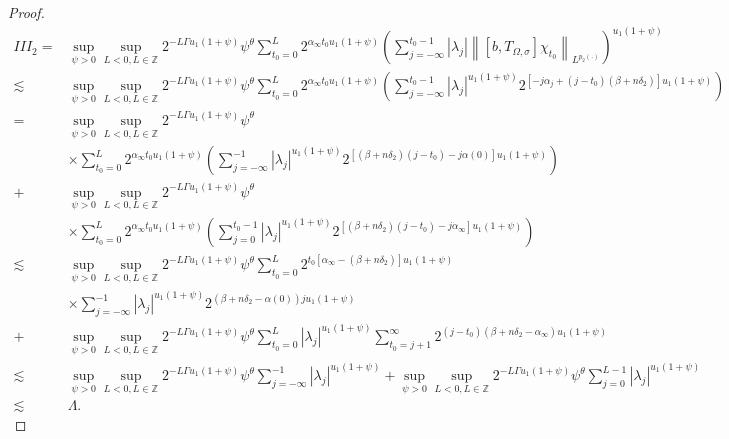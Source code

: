 \documentclass[oneside,reqno]{amsart}
\numberwithin{equation}{section}
\theoremstyle{definition}
\begin{document}
\begin{proof}
\begin{align*}
I I I_{2}= & \sup_{\psi>0}\sup _{L <  0, L \in \mathbb{Z}} 2^{-L \Gamma u_1(1+\psi)} \psi^\theta \sum_{t_0=0}^{L} 2^{\alpha_{\infty} t_0u _1(1+\psi)}\left(\sum_{j=-\infty}^{t_0-1}\left|\lambda_{j}\right|\left\|\left[b, T_{\Omega, \sigma}\right] \chi_{t_0}\right\|_{L^{p_2(\cdot)}}\right)^{u_1(1+\psi)} \\
\lesssim & \sup_{\psi>0}\sup _{L <  0, L \in \mathbb{Z}} 2^{-L \Gamma u_1(1+\psi)} \psi^\theta  \sum_{t_0=0}^{L} 2^{\alpha_{\infty} t_0u _1(1+\psi)}\left(\sum_{j=-\infty}^{t_0-1}\left|\lambda_{j}\right|^{u_1(1+\psi)} 2^{[-j \alpha_j +(j-t_0)(\beta+n\delta_2)] u_1(1+\psi)}\right) \\
= & \sup_{\psi>0}\sup _{L <  0, L \in \mathbb{Z}} 2^{-L \Gamma u_1(1+\psi)} \psi^\theta\\
& \times \sum_{t_0=0}^{L} 2^{\alpha_{\infty} t_0u _1(1+\psi)}\left(\sum_{j=-\infty}^{-1}\left|\lambda_{j}\right|^{u_1(1+\psi)} 2^{\left[(\beta+n\delta_2)(j-t_0)-j \alpha(0)\right] u_1(1+\psi)}\right) \\
+& \sup_{\psi>0}\sup _{L <  0, L \in \mathbb{Z}} 2^{-L \Gamma u_1(1+\psi)} \psi^\theta \\
& \times \sum_{t_0=0}^{L} 2^{\alpha_{\infty} t_0u _1(1+\psi)}\left(\sum_{j=0}^{t_0-1}\left|\lambda_{j}\right|^{u_1(1+\psi)} 2^{\left[(\beta+n\delta_2)(j-t_0)-j \alpha_{\infty}\right] u_1(1+\psi)}\right)\\
\lesssim & \sup_{\psi>0}\sup _{L <  0, L \in \mathbb{Z}} 2^{-L \Gamma u_1(1+\psi)} \psi^\theta \sum_{t_0=0}^{L} 2^{t_0\left[\alpha_{\infty}-(\beta+n\delta_2)\right]  u_1(1+\psi)} \\
& \times \sum_{j=-\infty}^{-1}\left|\lambda_{j}\right|^{u_1(1+\psi)} 2^{\left(\beta+n\delta_2-\alpha(0)\right) j u_1(1+\psi)} \\
+& \sup_{\psi>0}\sup _{L <  0, L \in \mathbb{Z}} 2^{-L \Gamma u_1(1+\psi)} \psi^\theta \sum_{t_0=0}^{L}\left|\lambda_{j}\right|^{u_1(1+\psi)} \sum_{t_0=j+1}^{\infty} 2^{(j-t_0)\left(\beta+n\delta_2-\alpha_{\infty}\right) u_1(1+\psi)} \\
\lesssim & \sup_{\psi>0}\sup _{L <  0, L \in \mathbb{Z}} 2^{-L \Gamma u_1(1+\psi)} \psi^\theta \sum_{j=-\infty}^{-1}\left|\lambda_{j}\right|^{u_1(1+\psi)}+\sup_{\psi>0}\sup _{L <  0, L \in \mathbb{Z}} 2^{-L \Gamma u_1(1+\psi)} \psi^\theta \sum_{j=0}^{L-1}\left|\lambda_{j}\right|^{u_1(1+\psi)} \\
\lesssim & \Lambda .
\end{align*}






\end{proof}
\end{document}
